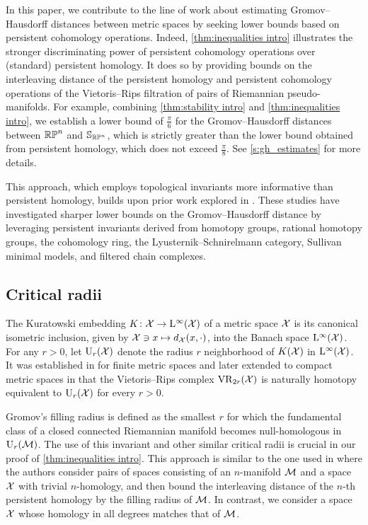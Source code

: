In this paper, we contribute to the line of work about estimating Gromov--Hausdorff distances between metric spaces by seeking lower bounds based on persistent cohomology operations. 
Indeed, \cref{thm:inequalities intro} illustrates the stronger discriminating power of persistent cohomology operations over (standard) persistent homology. 
It does so by providing bounds on the interleaving distance of the persistent homology and persistent cohomology operations of the Vietoris--Rips filtration of pairs of Riemannian pseudo-manifolds. 
For example, combining \cref{thm:stability intro} and \cref{thm:inequalities intro}, we establish a lower bound of $\frac{\pi}{6}$ for the Gromov--Hausdorff distances between \(\mathbb{RP}^n\) and \(\mathbb{S}_{\mathbb{RP}^n}\), which is strictly greater than the lower bound obtained from persistent homology, which does not exceed $\frac{\pi}{8}$.  
See \cref{s:gh_estimates} for more details.

This approach, which employs topological invariants more informative than persistent homology, builds upon prior work explored in \cite{zhou2023beyond, zhou2023persistent, memoli2024persistenthomotopy, memoli2024persistent, memoli2025ephemeral}. 
These studies have investigated sharper lower bounds on the Gromov--Hausdorff distance by leveraging persistent invariants derived from homotopy groups, rational homotopy groups, the cohomology ring, the Lyusternik--Schnirelmann category, Sullivan minimal models, and filtered chain complexes.

\subsection*{Critical radii} 

The Kuratowski embedding \(K \colon \mathcal{X} \to \mathrm{L}^\infty(\mathcal{X})\) of a metric space \(\mathcal{X}\) is its canonical isometric inclusion, given by \(\mathcal{X} \ni x \mapsto d_{\mathcal{X}}(x,\cdot)\), into the Banach space $\mathrm{L}^\infty(\mathcal{X})$.
For any $r>0$, let \(\mathrm{U}_r(\mathcal{X})\) denote the radius \(r\) neighborhood of \(K(\mathcal{X})\) in \(\mathrm{L}^\infty(\mathcal{X})\).
It was established in \cite{chazal2009gromov} for finite metric spaces and later extended to compact metric spaces in \cite{lim2024vietoris} that the Vietoris--Rips complex \(\mathrm{VR}_{2r}(\mathcal{X})\) is naturally homotopy equivalent to \(\mathrm{U}_r(\mathcal{X})\) for every \(r > 0\).

Gromov's filling radius is defined as the smallest \(r\) for which the fundamental class of a closed connected Riemannian manifold becomes null-homologous in \(\mathrm{U}_r(\mathcal{M})\).
The use of this invariant and other similar critical radii is crucial in our proof of \cref{thm:inequalities intro}.
This approach is similar to the one used in \cite[Prop.~9.38]{lim2024vietoris} where the authors consider pairs of spaces consisting of an $n$-manifold \(\mathcal{M}\) and a space \(\mathcal{X}\) with trivial \(n\)-homology, and then bound the interleaving distance of the \(n\)-th persistent homology by the filling radius of \(\mathcal{M}\).
In contrast, we consider a space \(\mathcal{X}\) whose homology in all degrees matches that of \(\mathcal{M}\).